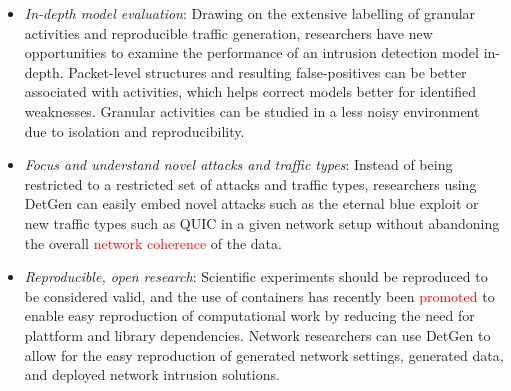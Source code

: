 \documentclass[sigconf]{acmart}
\begin{document}
\begin{itemize}

\item \textit{In-depth model evaluation}:
Drawing on the extensive labelling of granular activities and reproducible traffic generation, researchers have new opportunities to examine the performance of an intrusion detection model in-depth. 
Packet-level structures and resulting false-positives can be better associated with activities, which helps correct models better for identified weaknesses. Granular activities can be studied in a less noisy environment due to isolation and reproducibility. 



\item \textit{Focus and understand novel attacks and traffic types}: Instead of being restricted to a restricted set of attacks and traffic types, researchers using DetGen can easily embed novel attacks such as the eternal blue exploit or new traffic types such as QUIC in a given network setup without abandoning the overall \textcolor{red}{network coherence} of the data. 





\item \textit{Reproducible, open research}: Scientific experiments should be reproduced to be considered valid, and the use of containers has recently been \textcolor{red}{promoted} to enable easy reproduction of computational work by reducing the need for plattform and library dependencies. Network researchers can use DetGen to allow for the easy reproduction of generated network settings, generated data, and deployed network intrusion solutions. 

\end{itemize}
\end{document}
